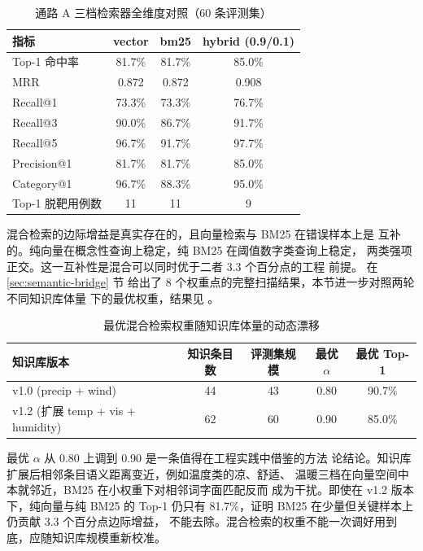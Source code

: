 \begin{table}[!htbp]
    \centering
    \caption{通路 A 三档检索器全维度对照（60 条评测集）}
    \label{tab:rag-mode-comparison}
    \song\fontsize{9pt}{12pt}\selectfont
    \renewcommand{\arraystretch}{0.95}
    \begin{tabular}{lccc}
        \toprule
        指标 & vector & bm25 & hybrid (0.9/0.1) \\
        \midrule
        Top-1 命中率 & 81.7\% & 81.7\% & 85.0\% \\
        MRR & 0.872 & 0.872 & 0.908 \\
        Recall@1 & 73.3\% & 73.3\% & 76.7\% \\
        Recall@3 & 90.0\% & 86.7\% & 91.7\% \\
        Recall@5 & 96.7\% & 91.7\% & 97.7\% \\
        Precision@1 & 81.7\% & 81.7\% & 85.0\% \\
        Category@1 & 96.7\% & 88.3\% & 95.0\% \\
        Top-1 脱靶用例数 & 11 & 11 & 9 \\
        \bottomrule
    \end{tabular}
\end{table}

混合检索的边际增益是真实存在的，且向量检索与 BM25 在错误样本上是
互补的。纯向量在概念性查询上稳定，纯 BM25 在阈值数字类查询上稳定，
两类强项正交。这一互补性是混合可以同时优于二者 3.3 个百分点的工程
前提。 在 \ref{sec:semantic-bridge} 节
给出了 8 个权重点的完整扫描结果，本节进一步对照两轮不同知识库体量
下的最优权重，结果见 。

\begin{table}[!htbp]
    \centering
    \caption{最优混合检索权重随知识库体量的动态漂移}
    \label{tab:rag-weight-drift}
    \song\wuhao
    \begin{tabular}{lcccc}
        \toprule
        知识库版本 & 知识条目数 & 评测集规模 & 最优 $\alpha$ & 最优 Top-1 \\
        \midrule
        v1.0 (precip + wind) & 44 & 43 & 0.80 & 90.7\% \\
        v1.2 (扩展 temp + vis + humidity) & 62 & 60 & 0.90 & 85.0\% \\
        \bottomrule
    \end{tabular}
\end{table}

最优 $\alpha$ 从 0.80 上调到 0.90 是一条值得在工程实践中借鉴的方法
论结论。知识库扩展后相邻条目语义距离变近，例如温度类的凉、舒适、
温暖三档在向量空间中本就邻近，BM25 在小权重下对相邻词字面匹配反而
成为干扰。即使在 v1.2 版本下，纯向量与纯 BM25 的 Top-1 仍只有
81.7\%，证明 BM25 在少量但关键样本上仍贡献 3.3 个百分点边际增益，
不能去除。混合检索的权重不能一次调好用到底，应随知识库规模重新校准。

